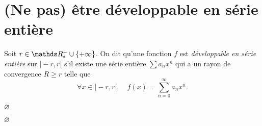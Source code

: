 \section{(Ne pas) être développable en série entière}

\begin{defn}
	Soit $r \in \R_*^+ \cup \{+\infty\} $. On dit qu'une fonction $f$\/ est \textit{développable en série entière} sur $]-r,r[$\/ s'il existe une série entière $\sum a_n x^n$\/ qui a un rayon de convergence $R \ge r$\/ telle que \[
		\forall x \in {]-r,r[},\quad f(x) = \sum_{n=0}^\infty a_n x^n
	.\]
\end{defn}

\begin{exm}
	$\varnothing$
\end{exm}

\begin{rmk}
	$\varnothing$\/
\end{rmk}

